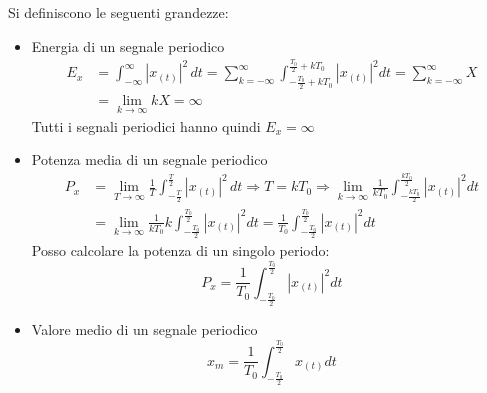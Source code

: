             Si definiscono le seguenti grandezze: 
            \begin{itemize}
                \item {Energia di un segnale periodico
                    \begin{align}
                        E_{x} & = \int_{-\infty}^{\infty}  |x_{(t)}|^2 \,dt =\sum_{k=-\infty}^{\infty}\int_{-\frac{T_0}{2}+kT_0}^{\frac{T_0}{2}+kT_0} |x_{(t)}|^2 dt =\sum_{k=-\infty}^{\infty} X  \nonumber \\
                            & = \lim_{k\rightarrow\infty} kX= \infty \nonumber
                    \end{align}
                    Tutti i segnali periodici hanno quindi $E_x = \infty$   
                }
                \item {Potenza media di un segnale periodico
                    \begin{align}
                        P_{x} & = \lim_{T\rightarrow\infty} \frac{1}{T} \int_{-\frac{T}{2}}^{\frac{T}{2}}  |x_{(t)}|^2 \,dt\Rightarrow T = kT_0 \Rightarrow \lim_{k\rightarrow\infty} \frac{1}{kT_0} \int_{-\frac{kT_0}{2}}^{\frac{kT_0}{2}} |x_{(t)}|^2 dt \nonumber \\
                            & = \lim_{k\rightarrow\infty} \frac{1}{kT_0} k \int_{-\frac{T_0}{2}}^{\frac{T_0}{2}} |x_{(t)}|^2 dt  = \frac{1}{T_0} \int_{-\frac{T_0}{2}}^{\frac{T_0}{2}} |x_{(t)}|^2 dt \nonumber
                    \end{align}      
                    Posso calcolare la potenza di un singolo periodo:
                    \[
                        P_x = \frac{1}{T_0} \int_{-\frac{T_0}{2}}^{\frac{T_0}{2}} |x_{(t)}|^2 dt  
                    \]
                }
                \item {Valore medio di un segnale periodico
                    \[
                        x_m = \frac{1}{T_0} \int_{-\frac{T_0}{2}}^{\frac{T_0}{2}} x_{(t)} dt  
                    \]
                }
            \end{itemize}   